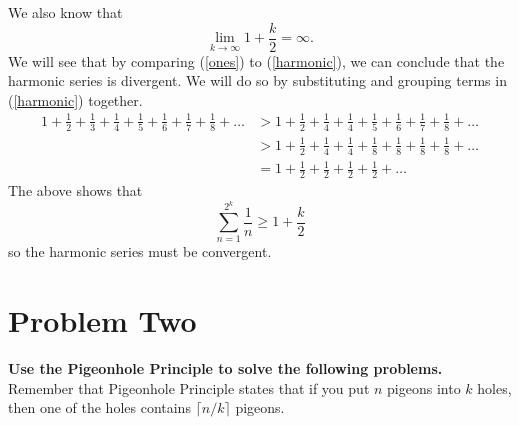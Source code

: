 We also know that
\begin{equation} \label{ones} %
\lim_{k \to \infty} 1 + \frac{k}{2} = \infty.
\end{equation}
We will see that by comparing (\ref{ones}) to (\ref{harmonic}), we can conclude that the harmonic series is divergent.
We will do so by substituting and grouping terms in (\ref{harmonic}) together.
\begin{align*}
1 + \frac{1}{2} + \frac{1}{3} + \frac{1}{4} + \frac{1}{5} + \frac{1}{6} + \frac{1}{7} + \frac{1}{8} + \dots
    &> 1 + \frac{1}{2} + \frac{1}{4} + \frac{1}{4} + \frac{1}{5} + \frac{1}{6} + \frac{1}{7} + \frac{1}{8} + \dots \\
    &> 1 + \frac{1}{2} + \frac{1}{4} + \frac{1}{4} + \frac{1}{8} + \frac{1}{8} + \frac{1}{8} + \frac{1}{8}  + \dots \\
    &= 1 + \frac{1}{2} + \frac{1}{2} + \frac{1}{2} + \frac{1}{2} + \dots
\end{align*}
The above shows that
\begin{equation*}
\sum_{n = 1}^{2^k} \frac{1}{n} \geq 1 + \frac{k}{2}
\end{equation*}
so the harmonic series must be convergent. 


\newpage

\section*{Problem Two}

\textbf{Use the Pigeonhole Principle to solve the following problems.}
Remember that Pigeonhole Principle states that if you put $n$ pigeons into $k$ holes, then one of the holes contains $\lceil n/k \rceil$ pigeons.

